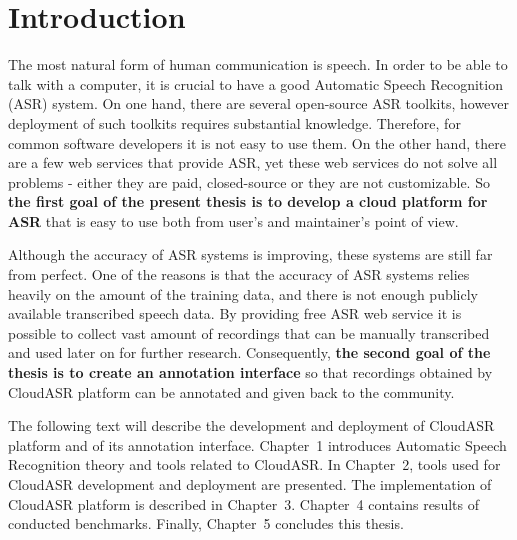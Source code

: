\chapter*{Introduction}

The most natural form of human communication is speech.
In order to be able to talk with a computer,
  it is crucial to have a good Automatic Speech Recognition (ASR) system.
On one hand, there are several open-source ASR toolkits,
  however deployment of such toolkits requires substantial knowledge.
Therefore, for common software developers it is not easy to use them.
On the other hand, there are a few web services that provide ASR,
  yet these web services do not solve all problems -
  either they are paid, closed-source or they are not customizable.
So \textbf{the first goal of the present thesis is to develop a cloud platform for ASR}
  that is easy to use both from user's and maintainer's point of view.

Although the accuracy of ASR systems is improving,
  these systems are still far from perfect.
One of the reasons is that the accuracy of ASR systems relies heavily on the amount of the training data,
  and there is not enough publicly available transcribed speech data.
By providing free ASR web service it is possible to collect vast amount of recordings
  that can be manually transcribed and used later on for further research.
Consequently, \textbf{the second goal of the thesis is to create an annotation interface}
  so that recordings obtained by CloudASR platform can be annotated and given back to the community.

The following text will describe the development and deployment of CloudASR platform and of its annotation interface.
Chapter~1 introduces Automatic Speech Recognition theory and tools related to CloudASR.
In Chapter~2, tools used for CloudASR development and deployment are presented.
The implementation of CloudASR platform is described in Chapter~3.
Chapter~4 contains results of conducted benchmarks.
Finally, Chapter~5 concludes this thesis.
